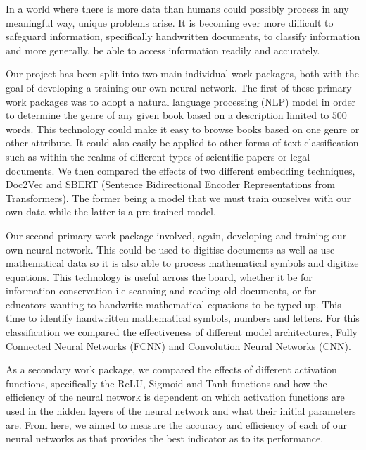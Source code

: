 \documentclass[twocolumn,pra,floatfix]{revtex4-2}
\begin{document}
        In a world where there is more data than humans could possibly process in any meaningful way, unique problems arise. It is becoming ever more difficult to safeguard information, specifically handwritten documents, to classify information and more generally, be able to access information readily and accurately. 


        
        Our project has been split into two main individual work packages, both with the goal of developing a training our own neural network. The first of these primary work packages was to adopt a natural language processing (NLP) model in order to determine the genre of any given book based on a description limited to $500$ words. This technology could make it easy to browse books based on one genre or other attribute. It could also easily be applied to other forms of text classification such as within the realms of different types of scientific papers or legal documents. We then compared the effects of two different embedding techniques, Doc2Vec and SBERT (Sentence Bidirectional Encoder Representations from Transformers). The former being a model that we must train ourselves with our own data while the latter is a pre-trained model. 
        
        Our second primary work package involved, again, developing and training our own neural network. This could be used to digitise documents as well as use mathematical data so it is also able to process mathematical symbols and digitize equations. This technology is useful across the board, whether it be for information conservation i.e scanning and reading old documents, or for educators wanting to handwrite mathematical equations to be typed up. This time to identify handwritten mathematical symbols, numbers and letters. For this classification we compared the effectiveness of different model architectures, Fully Connected Neural Networks (FCNN) and Convolution Neural Networks (CNN). 
        
        As a secondary work package, we compared the effects of different activation functions, specifically the ReLU, Sigmoid and Tanh functions and how the efficiency of the neural network is dependent on which activation functions are used in the hidden layers of the neural network and what their initial parameters are. From here, we aimed to measure the accuracy and efficiency of each of our neural networks as that provides the best indicator as to its performance.
\end{document}

